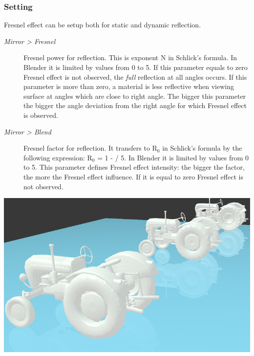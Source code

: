 \documentclass[a4paper,12pt,oneside]{sphinxmanual}
\begin{document}
\subsubsection{Setting}
\label{materials:id12}
Fresnel effect can be setup both for static and dynamic reflection.
\begin{description}
\item[{\emph{Mirror \textgreater{} Fresnel}}] \leavevmode
Fresnel power for reflection. This is exponent N in Schlick's formula. In Blender it is limited by values from 0 to 5. If this parameter equals to zero Fresnel effect is not observed, the \emph{full} reflection at all angles occurs. If this parameter is more than zero, a material is less reflective when viewing surface at angles which are close to right angle. The bigger this parameter the bigger the angle deviation from the right angle for which Fresnel effect is observed.

\item[{\emph{Mirror \textgreater{} Blend}}] \leavevmode
Fresnel factor for reflection. It transfers to R$_{\text{0}}$ in Schlick's formula by the following expression: R$_{\text{0}}$ = 1 -  / 5. In Blender it is limited by values from 0 to 5. This parameter defines Fresnel effect intensity: the bigger the  factor, the more the Fresnel effect influence. If it is equal to zero Fresnel effect is not observed.

\end{description}

{\hfill\includegraphics[width=1.000\linewidth]{reflection_dynamic_and_fresnel.jpg}\hfill}

\begin{DUlineblock}{0em}
\item[] 
\end{DUlineblock}
\end{document}
